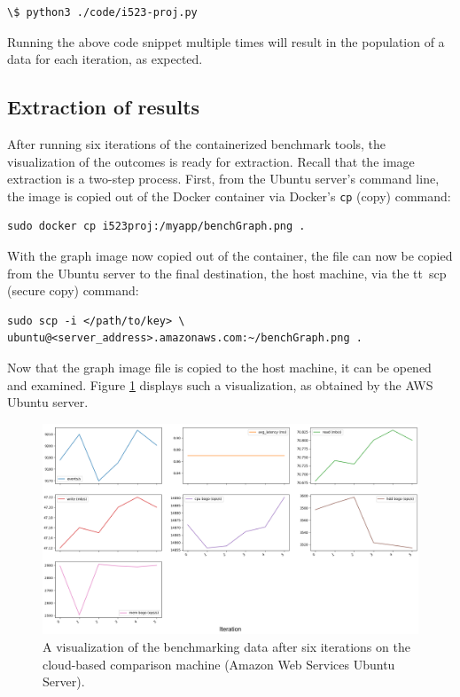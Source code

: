 \documentclass[sigconf]{acmart}
\begin{document}
\begin{lstlisting}
\$ python3 ./code/i523-proj.py
\end{lstlisting}

Running the above code snippet multiple times will result in the population of a data for each iteration, as expected.

\subsection{Extraction of results}
After running six iterations of the containerized benchmark tools, the visualization of the outcomes is ready for extraction. Recall that the image extraction is a two-step process. First, from the Ubuntu server's command line, the image is copied out of the Docker container via Docker's {\tt cp} (copy) command:

\begin{lstlisting}
sudo docker cp i523proj:/myapp/benchGraph.png .
\end{lstlisting}

With the graph image now copied out of the container, the file can now be copied from the Ubuntu server to the final destination, the host machine, via the {tt\ scp} (secure copy) command: 

\begin{lstlisting}
sudo scp -i </path/to/key> \ ubuntu@<server_address>.amazonaws.com:~/benchGraph.png .
\end{lstlisting}

Now that the graph image file is copied to the host machine, it can be opened and examined. Figure \ref{f:plotAWS} displays such a visualization, as obtained by the AWS Ubuntu server.

\begin{figure}[!ht]
  \centering\includegraphics[width=\columnwidth]{images/benchGraph_AWS.png}
  \caption{A visualization of the benchmarking data after six iterations on the cloud-based comparison machine (Amazon Web Services Ubuntu Server).}\label{f:plotAWS}
\end{figure}
\end{document}
